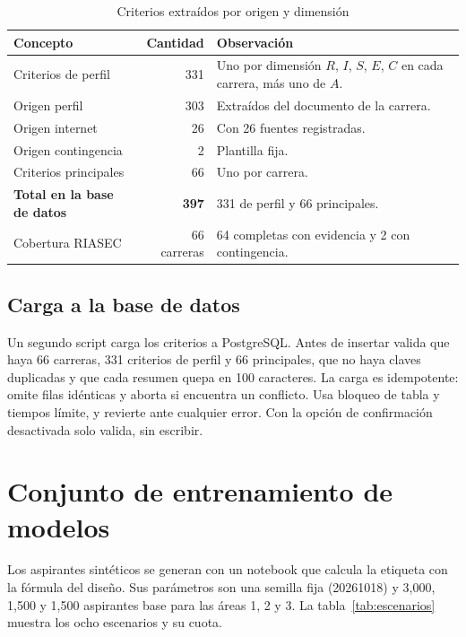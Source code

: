 \begin{table}[H]
\centering
\small
\renewcommand{\arraystretch}{1.2}
\caption{Criterios extraídos por origen y dimensión}
\label{tab:criterios}
\begin{tabularx}{\textwidth}{L{0.30\textwidth}rX}
\toprule
{} \color{white}\textbf{Concepto} & \color{white}\textbf{Cantidad} & \color{white}\textbf{Observación} \\
\midrule
Criterios de perfil & 331 & Uno por dimensión $R$, $I$, $S$, $E$, $C$ en cada carrera, más uno de $A$. \\
\quad Origen perfil & 303 & Extraídos del documento de la carrera. \\
\quad Origen internet & 26 & Con 26 fuentes registradas. \\
\quad Origen contingencia & 2 & Plantilla fija. \\
Criterios principales & 66 & Uno por carrera. \\
\textbf{Total en la base de datos} & \textbf{397} & 331 de perfil y 66 principales. \\
Cobertura RIASEC & 66 carreras & 64 completas con evidencia y 2 con contingencia. \\
\bottomrule
\end{tabularx}
\end{table}

\subsection{Carga a la base de datos}
Un segundo script carga los criterios a PostgreSQL. Antes de insertar valida que haya 66 carreras, 331 criterios de perfil y 66 principales, que no haya claves duplicadas y que cada resumen quepa en 100 caracteres. La carga es idempotente: omite filas idénticas y aborta si encuentra un conflicto. Usa bloqueo de tabla y tiempos límite, y revierte ante cualquier error. Con la opción de confirmación desactivada solo valida, sin escribir.

\section{Conjunto de entrenamiento de modelos}
Los aspirantes sintéticos se generan con un notebook que calcula la etiqueta con la fórmula del diseño. Sus parámetros son una semilla fija (20261018) y 3,000, 1,500 y 1,500 aspirantes base para las áreas 1, 2 y 3. La tabla~\ref{tab:escenarios} muestra los ocho escenarios y su cuota.

